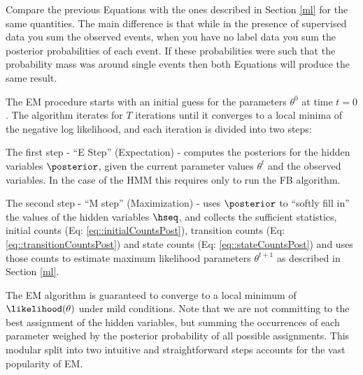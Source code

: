 Compare the previous Equations with the ones described in Section
\ref{ml} for the same quantities. The main difference is that while in
the presence of supervised data you sum the observed events, when you
have no label data you sum the posterior probabilities of each
event. If these probabilities were such that the probability mass was
around single events then both Equations will produce the same result.



The EM procedure starts with an initial guess for the parameters
$\theta^0$ at time $t = 0$. The algorithm iterates for $T$ iterations
until it converges to a local minima of the negative log likelihood, and each
iteration is divided into two steps:

\begin{description} 
 \item The first step - ``E Step'' (Expectation) - 
computes the posteriors for the hidden variables
$\posterior$, given the current parameter values $\theta^t$ and the observed variables. 
In the case of the HMM this requires only to run the FB algorithm.
\item The second step - ``M step'' (Maximization) - uses $\posterior$ to
``softly fill in'' the values of the hidden variables $\hseq$, and
collects the sufficient statistics, initial counts (Eq: \ref{eq::initialCountsPost}), transition counts (Eq:
\ref{eq::transitionCountsPost}) 
and state counts (Eq: \ref{eq::stateCountsPost}) and uses those
counts to estimate maximum likelihood parameters $\theta^{t+1}$ as described in
Section \ref{ml}.
\end{description}

The EM algorithm is guaranteed to
converge to a local minimum of $\likelihood(\theta)$ under mild
conditions.  
Note that we are not committing to the best assignment of the hidden variables, but
summing the occurrences of each parameter weighed by the posterior
probability of all possible assignments. 
This modular split into two intuitive and straightforward steps
accounts for the vast popularity of EM.

